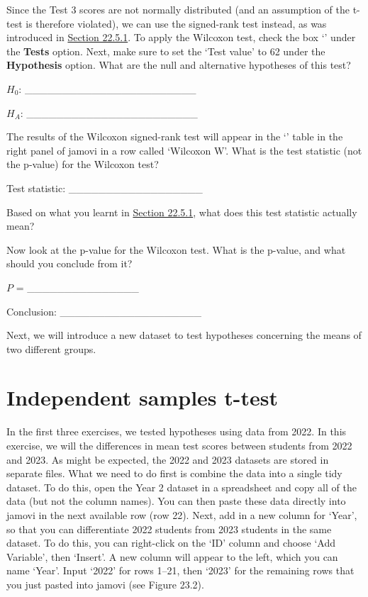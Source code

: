 \documentclass[
  openany]{krantz}
\begin{document}
\begin{verbatim}

\end{verbatim}

Since the Test 3 scores are not normally distributed (and an assumption of the t-test is therefore violated), we can use the   signed-rank test instead, as was introduced in \protect\hyperlink{wilcoxon-test}{Section 22.5.1}.
To apply the Wilcoxon test, check the box `' under the \textbf{Tests} option.
Next, make sure to set the `Test value' to 62 under the \textbf{Hypothesis} option.
What are the null and alternative hypotheses of this test?

\(H_{0}\): \_\_\_\_\_\_\_\_\_\_\_\_\_\_\_\_\_\_\_\_\_\_\_

\(H_{A}\): \_\_\_\_\_\_\_\_\_\_\_\_\_\_\_\_\_\_\_\_\_\_\_

The results of the Wilcoxon signed-rank test will appear in the `' table in the right panel of jamovi in a row called `Wilcoxon W'.
What is the test statistic (not the p-value) for the Wilcoxon test?

Test statistic: \_\_\_\_\_\_\_\_\_\_\_\_\_\_\_\_\_\_

Based on what you learnt in \protect\hyperlink{wilcoxon-test}{Section 22.5.1}, what does this test statistic actually mean?

\newpage

Now look at the p-value for the Wilcoxon test.
What is the p-value, and what should you conclude from it?

\(P\) = \_\_\_\_\_\_\_\_\_\_\_\_\_\_\_

Conclusion: \_\_\_\_\_\_\_\_\_\_\_\_\_\_\_\_\_\_\_

Next, we will introduce a new dataset to test hypotheses concerning the means of two different groups.

\hypertarget{independent-samples-t-test-1}{%
\section{Independent samples t-test}\label{independent-samples-t-test-1}}

In the first three exercises, we tested hypotheses using data from 2022.
In this exercise, we will  the differences in mean test scores between students from 2022 and 2023.
As might be expected, the 2022 and 2023 datasets are stored in separate files.
What we need to do first is combine the data into a single tidy dataset.
To do this, open the Year 2 dataset in a spreadsheet and copy all of the data (but not the column names).
You can then paste these data directly into jamovi in the next available row (row 22).
Next, add in a new column for `Year', so that you can differentiate 2022 students from 2023 students in the same dataset.
To do this, you can right-click on the `ID' column and choose `Add Variable', then `Insert'.
A new column will appear to the left, which you can name `Year'.
Input `2022' for rows 1--21, then `2023' for the remaining rows that you just pasted into jamovi (see Figure 23.2).
\end{document}
